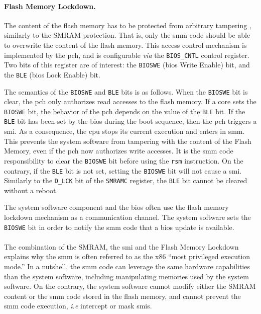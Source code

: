 \paragraph{Flash Memory Lockdown.}
%
The content of the flash memory has to be protected from arbitrary tampering ,
similarly to the SMRAM protection.
%
That is, only the \ac{smm} code should be able to overwrite the content of the
flash memory.
%
This access control mechanism is implemented by the \ac{pch}, and is
configurable \emph{via} the \texttt{BIOS\_CNTL} control register.
%
Two bits of this register are of interest: the \texttt{BIOSWE} (\ac{bios} Write
Enable) bit, and the \texttt{BLE} (\ac{bios} Lock Enable) bit.

The semantics of the \texttt{BIOSWE} and \texttt{BLE} bits is as follows.
%
When the \texttt{BIOSWE} bit is clear, the \ac{pch} only authorizes read
accesses to the flash memory.
%
If a core sets the \texttt{BIOSWE} bit, the behavior of the \ac{pch} depends on
the value of the \texttt{BLE} bit.
%
If the \texttt{BLE} bit has been set by the \ac{bios} during the boot sequence,
then the \ac{pch} triggers a \ac{smi}.
%
As a consequence, the \ac{cpu}  stops its current execution and enters in
\ac{smm}.
%
This prevents the system software from tampering  with the content of the Flash Memory, even if the \ac{pch} now authorizes write accesses.
%
It is the \ac{smm} code responsibility to clear the \texttt{BIOSWE} bit before
using the \texttt{rsm} instruction.
%
On the contrary, if the \texttt{BLE} bit is not set, setting the \texttt{BIOSWE}
bit will not cause a \ac{smi}. 
%
Similarly to the \texttt{D\_LCK} bit of the \texttt{SMRAMC} register, the
\texttt{BLE} bit cannot be cleared without a reboot.


The system software component and the \ac{bios} often use the flash memory
lockdown mechanism as a communication channel.
%
The system software sets the \texttt{BIOSWE} bit in order to notify the \ac{smm}
code that a \ac{bios} update is available.

\paragraph{}
%
The combination of the SMRAM, the \ac{smi} and the Flash Memory Lockdown
explains why the \ac{smm} is often referred to as the x86 ``most privileged
execution mode.''
%
In a nutshell, the \ac{smm} code can leverage the same hardware capabilities
than the system software, including manipulating memories used by the
system software.
%
On the contrary, the system software cannot modify either the SMRAM content or
the \ac{smm} code stored in the flash memory, and cannot prevent the \ac{smm}
code execution, \emph{i.e} intercept or mask \acp{smi}.




